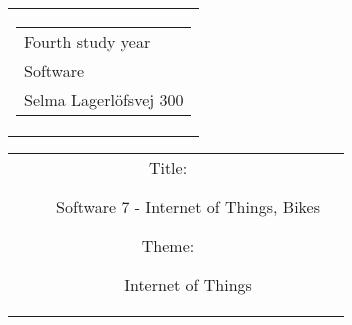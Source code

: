 

\thispagestyle{empty}
\begin{titlingpage}
 \begin{nopagebreak}
 {\samepage 
 \begin{tabular}{r}
\parbox{\textwidth}{  
 \hfill \parbox{4.9cm}{\begin{tabular}{l}
{\small Fourth study year} \\
{\small Software} \\
{\small Selma Lagerlöfsvej 300} \\
 \end{tabular}}
}
\end{tabular}

 \begin{tabular}{cc}
\parbox{7cm}{
\begin{description}

\item[Title:] 

Software 7 - Internet of Things, Bikes
  
\item[Theme:]

Internet of Things


 \end{description}

\parbox{8cm}{

}}
\end{tabular}}
\end{nopagebreak}
\end{titlingpage}
